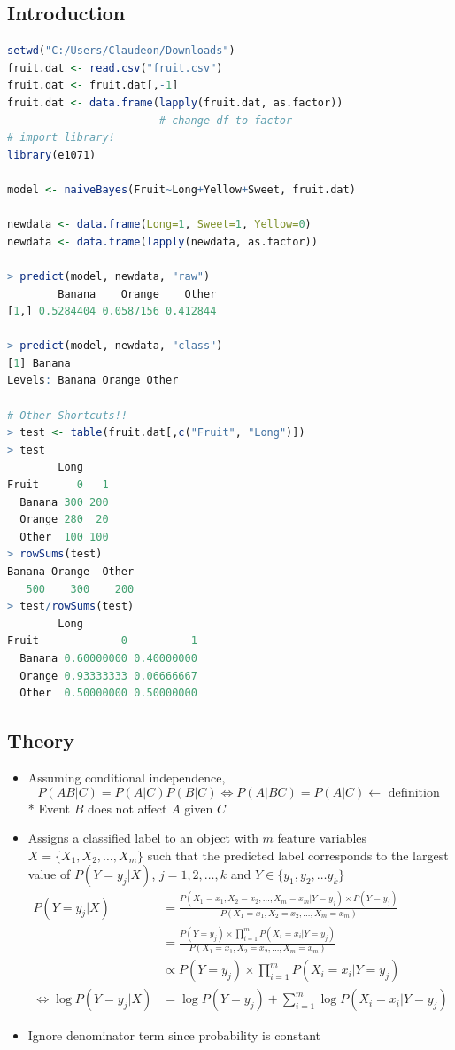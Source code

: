 \documentclass{article}
\begin{document}
\subsection{Introduction}
\begin{lstlisting}[language=R]
setwd("C:/Users/Claudeon/Downloads")
fruit.dat <- read.csv("fruit.csv")
fruit.dat <- fruit.dat[,-1]
fruit.dat <- data.frame(lapply(fruit.dat, as.factor))
                        # change df to factor
# import library!
library(e1071)

model <- naiveBayes(Fruit~Long+Yellow+Sweet, fruit.dat)

newdata <- data.frame(Long=1, Sweet=1, Yellow=0)
newdata <- data.frame(lapply(newdata, as.factor))

> predict(model, newdata, "raw")
        Banana    Orange    Other
[1,] 0.5284404 0.0587156 0.412844

> predict(model, newdata, "class")
[1] Banana
Levels: Banana Orange Other

# Other Shortcuts!!
> test <- table(fruit.dat[,c("Fruit", "Long")])
> test
        Long
Fruit      0   1
  Banana 300 200
  Orange 280  20
  Other  100 100
> rowSums(test)
Banana Orange  Other 
   500    300    200 
> test/rowSums(test)
        Long
Fruit             0          1
  Banana 0.60000000 0.40000000
  Orange 0.93333333 0.06666667
  Other  0.50000000 0.50000000
\end{lstlisting}
\subsection{Theory}
\begin{itemize}
    \item Assuming conditional independence,
    $$P(AB|C) = P(A|C)P(B|C) \Leftrightarrow P(A|BC) = P(A|C) \leftarrow \text{ definition }$$
    * Event $B$ does not affect $A$ given $C$
    
    \item Assigns a classified label to an object with $m$ feature variables $X = \{X_1, X_2, \dots, X_m\}$ such that the predicted label corresponds to the largest value of $P(Y=y_j|X)$, $j=1,2,\dots,k$ and $Y \in \{y_1, y_2, \dots y_k\}$
    \begin{equation*}
        \begin{split}
            P(Y=y_j|X) &= \frac{P(X_1=x_1,X_2=x_2, \dots, X_m=x_m|Y=y_j)\times P(Y=y_j)}{P(X_1=x_1,X_2=x_2, \dots, X_m=x_m)}\\
            &= \frac{P(Y=y_j)\times \prod_{i=1}^{m}P(X_i=x_i|Y=y_j)}{P(X_1=x_1,X_2=x_2, \dots, X_m=x_m)}\\
            &\propto P(Y=y_j)\times \prod_{i=1}^{m}P(X_i=x_i|Y=y_j)\\
            \Leftrightarrow \log{P(Y=y_j|X)} &= \log{P(Y=y_j)} + \sum_{i=1}^{m} \log{P(X_i=x_i|Y=y_j)}
        \end{split}
    \end{equation*}
    
    \item Ignore denominator term since probability is constant
\end{itemize}
\end{document}
